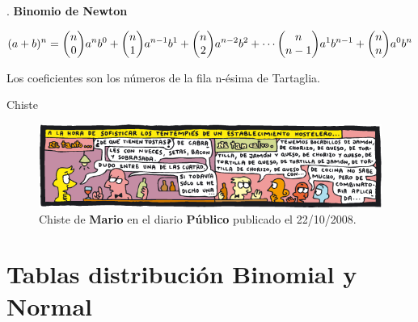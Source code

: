 \begin{theorem}
	. \textbf{Binomio de Newton}
	

$$(a+b)^n  = \mqty(n\\0)a^nb^0+\mqty(n\\1)a^{n-1}b^1+\mqty(n\\2)a^{n-2}b^2+ \cdots \mqty(n\\n-1)a^1b^{n-1}+\mqty(n\\n)a^0b^n $$

\vspace{2mm} Los coeficientes son los números de la fila n-ésima de Tartaglia.
	 
\end{theorem}


\begin{myexampleblock}{Chiste}
	\begin{figure}[H]
	\centering
	\includegraphics[width=1\textwidth]{imagenes/apendices/app11.png}
	\caption*{\scriptsize{Chiste de \textbf{Mario} en el diario \textbf{Público} publicado el 22/10/2008}\normalsize{.}}
	\end{figure}
\end{myexampleblock}


\chapter{Tablas distribución Binomial y Normal}

